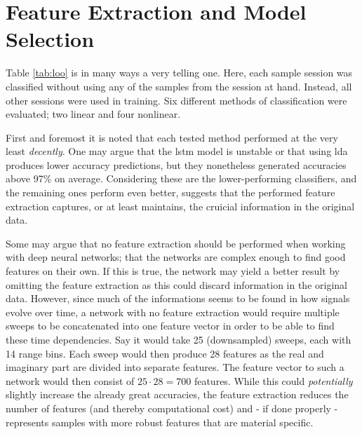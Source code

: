 






\section{Feature Extraction and Model Selection}
Table \ref{tab:loo} is in many ways a very telling one. Here, each sample session was classified without using any of the samples from the session at hand. Instead, all other sessions were used in training. Six different methods of classification were evaluated; two linear and four nonlinear. 

First and foremost it is noted that each tested method performed at the very least \emph{decently}. One may argue that the \gls{lstm} model is unstable or that using \gls{lda} produces lower accuracy predictions, but they nonetheless generated accuracies above 97\% on average. Considering these are the lower-performing classifiers, and the remaining ones perform even better, suggests that the performed feature extraction captures, or at least maintains, the cruicial information in the original data. 

Some may argue that no feature extraction should be performed when working with deep neural networks; that the networks are complex enough to find good features on their own. If this is true, the network may yield a better result by omitting the feature extraction as this could discard information in the original data. However, since much of the informations seems to be found in how signals evolve over time, a network with no feature extraction would require multiple sweeps to be concatenated into one feature vector in order to be able to find these time dependencies. Say it would take 25 (downsampled) sweeps, each with 14 range bins. Each sweep would then produce 28 features as the real and imaginary part are divided into separate features. The feature vector to such a network would then consist of $25\cdot 28=700$ features. While this could \textit{potentially} slightly increase the already great accuracies, the feature extraction reduces the number of features (and thereby computational cost) and - if done properly - represents samples with more robust features that are material specific.

